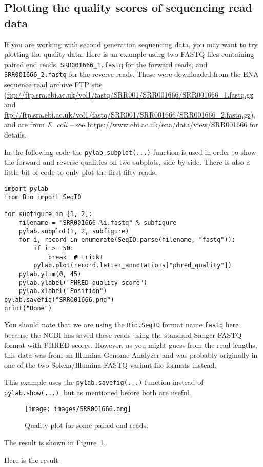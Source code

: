 \subsection{Plotting the quality scores of sequencing read data}

If you are working with second generation sequencing data, you may want to try plotting
the quality data. Here is an example using two FASTQ files containing paired end reads,
\texttt{SRR001666\_1.fastq} for the forward reads, and  \texttt{SRR001666\_2.fastq} for
the reverse reads. These were downloaded from the ENA sequence read archive FTP site
(\url{ftp://ftp.sra.ebi.ac.uk/vol1/fastq/SRR001/SRR001666/SRR001666_1.fastq.gz} and
\url{ftp://ftp.sra.ebi.ac.uk/vol1/fastq/SRR001/SRR001666/SRR001666_2.fastq.gz}), and
are from \textit{E. coli} -- see \url{https://www.ebi.ac.uk/ena/data/view/SRR001666}
for details.

In the following code the \verb|pylab.subplot(...)| function is used in order to show
the forward and reverse qualities on two subplots, side by side. There is also a little
bit of code to only plot the first fifty reads.

\begin{verbatim}
import pylab
from Bio import SeqIO

for subfigure in [1, 2]:
    filename = "SRR001666_%i.fastq" % subfigure
    pylab.subplot(1, 2, subfigure)
    for i, record in enumerate(SeqIO.parse(filename, "fastq")):
        if i >= 50:
            break  # trick!
        pylab.plot(record.letter_annotations["phred_quality"])
    pylab.ylim(0, 45)
    pylab.ylabel("PHRED quality score")
    pylab.xlabel("Position")
pylab.savefig("SRR001666.png")
print("Done")
\end{verbatim}

You should note that we are using the \verb|Bio.SeqIO| format name \texttt{fastq}
here because the NCBI has saved these reads using the standard Sanger FASTQ format
with PHRED scores. However, as you might guess from the read lengths, this data was
from an Illumina Genome Analyzer and was probably originally in one of the two
Solexa/Illumina FASTQ variant file formats instead.

This example uses the \verb|pylab.savefig(...)| function instead of
\verb|pylab.show(...)|, but as mentioned before both are useful.
\begin{latexonly}
\begin{figure}[htbp]
\centering
\texttt{[image: images/SRR001666.png]}
\caption{Quality plot for some paired end reads.}
\label{fig:paired-end-qual-plot}
\end{figure}
The result is shown in Figure~\ref{fig:paired-end-qual-plot}.
\end{latexonly}
\begin{htmlonly}
Here is the result:


\end{htmlonly}

